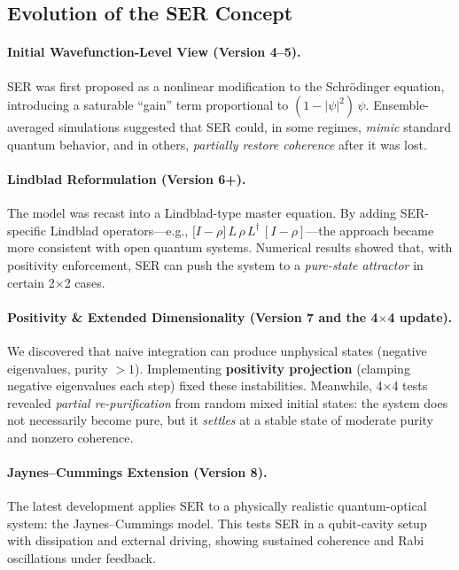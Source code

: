 \documentclass{article}
\begin{document}
\subsection{Evolution of the SER Concept}

\paragraph{Initial Wavefunction-Level View (Version 4--5).}
SER was first proposed as a nonlinear modification to the Schr\"odinger equation, introducing a saturable ``gain'' term proportional to $(1 - |\psi|^2)\,\psi$. Ensemble-averaged simulations suggested that SER could, in some regimes, \emph{mimic} standard quantum behavior, and in others, \emph{partially restore coherence} after it was lost.

\paragraph{Lindblad Reformulation (Version 6+).}
The model was recast into a Lindblad-type master equation. By adding SER-specific Lindblad operators---e.g., $\bigl[I - \rho\bigr]\,L\,\rho\,L^\dagger\,[I - \rho]$---the approach became more consistent with open quantum systems. Numerical results showed that, with positivity enforcement, SER can push the system to a \emph{pure-state attractor} in certain 2$\times$2 cases.

\paragraph{Positivity \& Extended Dimensionality (Version 7 and the 4$\times$4 update).}
We discovered that naive integration can produce unphysical states (negative eigenvalues, purity $> 1$). Implementing \textbf{positivity projection} (clamping negative eigenvalues each step) fixed these instabilities. Meanwhile, 4$\times$4 tests revealed \emph{partial re-purification} from random mixed initial states: the system does not necessarily become pure, but it \emph{settles} at a stable state of moderate purity and nonzero coherence.

\paragraph{Jaynes--Cummings Extension (Version 8).}
The latest development applies SER to a physically realistic quantum-optical system: the Jaynes--Cummings model. This tests SER in a qubit-cavity setup with dissipation and external driving, showing sustained coherence and Rabi oscillations under feedback.
\end{document}
